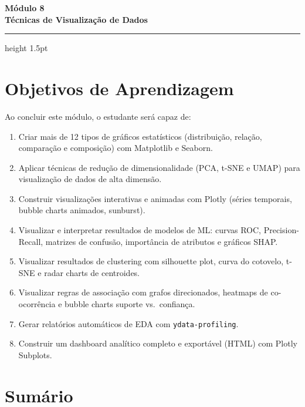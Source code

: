 \documentclass[12pt,a4paper]{article}
\begin{document}
\begin{center}
  {\LARGE\bfseries\color{mineblue} Módulo 8}\\[0.4em]
  {\large\bfseries Técnicas de Visualização de Dados}\\[0.6em]
\end{center}
\vspace{0.5em}
\hrule height 1.5pt
\vspace{1em}

\section{Objetivos de Aprendizagem}

Ao concluir este módulo, o estudante será capaz de:

\begin{enumerate}[label=\faIcon{check-circle}~\textbf{\arabic*.}, leftmargin=2cm, itemsep=0.3em]
  \item Criar mais de 12 tipos de gráficos estatísticos (distribuição, relação, comparação e composição) com Matplotlib e Seaborn.
  \item Aplicar técnicas de redução de dimensionalidade (PCA, t-SNE e UMAP) para visualização de dados de alta dimensão.
  \item Construir visualizações interativas e animadas com Plotly (séries temporais, bubble charts animados, sunburst).
  \item Visualizar e interpretar resultados de modelos de ML: curvas ROC, Precision-Recall, matrizes de confusão, importância de atributos e gráficos SHAP.
  \item Visualizar resultados de clustering com silhouette plot, curva do cotovelo, t-SNE e radar charts de centroides.
  \item Visualizar regras de associação com grafos direcionados, heatmaps de co-ocorrência e bubble charts suporte vs.\ confiança.
  \item Gerar relatórios automáticos de EDA com \texttt{ydata-profiling}.
  \item Construir um dashboard analítico completo e exportável (HTML) com Plotly Subplots.
\end{enumerate}

\section*{Sumário}
\end{document}
